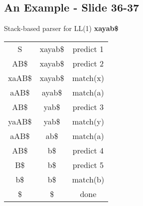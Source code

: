 \documentclass{report}
\begin{document}
\subsection{An Example - Slide 36-37}
Stack-based parser for LL(1) \textbf{xayab\$}\newline
\begin{tabular}{|c|c|c|}
\hline
	\thead{Parse stack} & \thead{Remaining Input} & \thead{Parser action}\\
\hline
	S       & xayab\$ & predict 1\\
\hline
	AB\$   & xayab\$ & predict 2\\
\hline
	xaAB\$ & xayab\$ & match(x)\\
\hline
	aAB\$  & ayab\$   & match(a)\\
\hline
	AB\$  & yab\$   & predict 3\\
\hline
	yaAB\$ & yab\$   & match(y)\\
\hline
	aAB\$  & ab\$    & match(a)\\
\hline
	AB\$   & b\$     & predict 4\\
\hline
	B\$    & b\$    & predict 5\\
\hline
	b\$    & b\$    & match(b)\\
\hline
	\$     & \$     & done\\
\hline
\end{tabular}

\newpage
\end{document}
